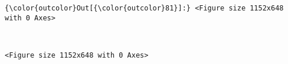 \documentclass[11pt]{article}
\begin{document}
\begin{Verbatim}[commandchars=\\\{\}]
{\color{outcolor}Out[{\color{outcolor}81}]:} <Figure size 1152x648 with 0 Axes>
\end{Verbatim}
            
    \begin{center}
    \end{center}
    { \hspace*{\fill} \\}
    
    
    \begin{verbatim}
<Figure size 1152x648 with 0 Axes>
    \end{verbatim}

    

    
    
    
    
\end{document}
